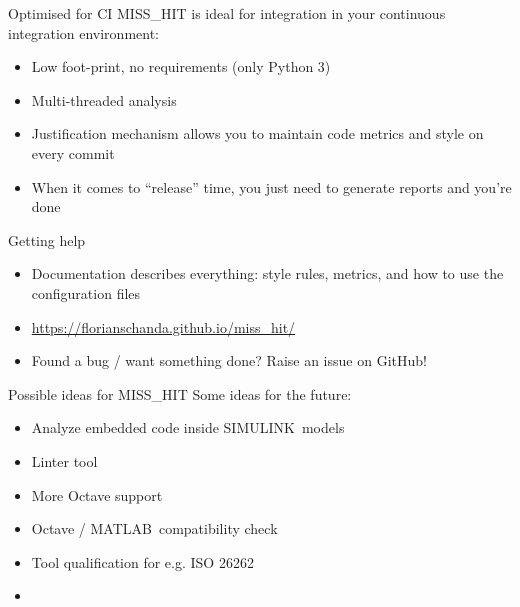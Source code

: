 \documentclass{beamer}
\begin{document}
\begin{frame}{Optimised for CI}
  MISS\_HIT is ideal for integration in your continuous integration
  environment:
  \begin{itemize}
  \item Low foot-print, no requirements (only Python 3)
  \item Multi-threaded analysis
  \item Justification mechanism allows you to maintain code metrics
    and style on every commit
  \item When it comes to ``release'' time, you just need to generate
    reports and you're done
  \end{itemize}
\end{frame}

\begin{frame}{Getting help}
  \begin{itemize}
  \item Documentation describes everything: style rules, metrics, and
    how to use the configuration files
  \item \url{https://florianschanda.github.io/miss_hit/}
  \item Found a bug / want something done? Raise an issue on GitHub!
  \end{itemize}
\end{frame}

\begin{frame}{Possible ideas for MISS\_HIT}
  Some ideas for the future:
  \begin{itemize}
  \item Analyze embedded code inside SIMULINK\texttrademark\ models
  \item Linter tool
  \item More Octave support
  \item Octave / MATLAB\texttrademark\ compatibility check
  \item Tool qualification for e.g. ISO 26262
    \pause
  \item {}
  \end{itemize}
\end{frame}
\end{document}
